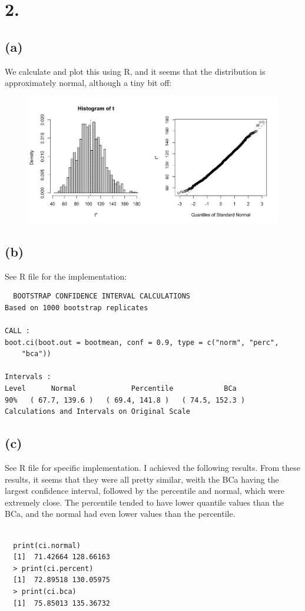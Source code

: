 \documentclass{article}
\begin{document}
\section*{2.}
{\Large

\subsection*{(a)}

We calculate and plot this using R, and it seems that the distribution is approximately normal, although a tiny bit off:
\begin{figure}[h!]
  \centering
  \includegraphics[width=500pt]{hw6_2a.png}
\end{figure}

\subsection*{(b)}

See R file for the implementation: \\
\begin{verbatim}
  BOOTSTRAP CONFIDENCE INTERVAL CALCULATIONS
Based on 1000 bootstrap replicates

CALL : 
boot.ci(boot.out = bootmean, conf = 0.9, type = c("norm", "perc", 
    "bca"))

Intervals : 
Level      Normal             Percentile            BCa          
90%   ( 67.7, 139.6 )   ( 69.4, 141.8 )   ( 74.5, 152.3 )  
Calculations and Intervals on Original Scale
\end{verbatim}

\subsection*{(c)}

See R file for specific implementation. I achieved the following results. From these results, it seems that they were all pretty similar, weith the BCa having the largest confidence interval, followed by the percentile and normal, which were extremely close. The percentile tended to have lower quantile values than the BCa, and the normal had even lower values than the percentile. \\ \\ 
\begin{verbatim}
  print(ci.normal)
  [1]  71.42664 128.66163
  > print(ci.percent)
  [1]  72.89518 130.05975
  > print(ci.bca)
  [1]  75.85013 135.36732
\end{verbatim}

}
\end{document}
